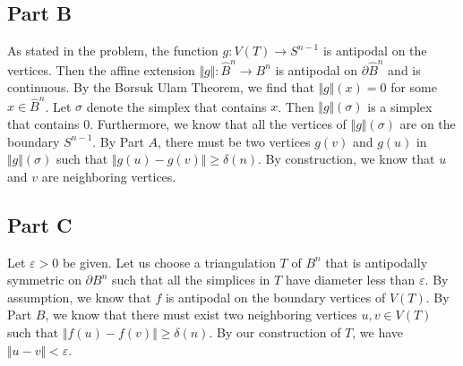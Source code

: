 \documentclass[12pt]{article}
\begin{document}
\subsection*{Part B}
As stated in the problem, the function $g: V(T) \rightarrow S^{n-1}$ is antipodal on the vertices. Then the affine extension $\Vert g \Vert: \hat{B}^n \rightarrow B^n$ is antipodal on $\partial{\hat{B}^n}$ and is continuous. By the Borsuk Ulam Theorem, we find that $\Vert g\Vert(x) = 0$ for some $x \in \hat{B}^n$. Let $\sigma$ denote the simplex that contains $x$. Then $\Vert g \Vert(\sigma)$ is a simplex that contains $0$. Furthermore, we know that all the vertices of $\Vert g \Vert(\sigma)$ are on the boundary $S^{n-1}$. By Part $A$, there must be two vertices $g(v)$ and $g(u)$ in $\Vert g \Vert(\sigma)$ such that $\Vert g(u) - g(v) \Vert \geq \delta(n)$.  By construction, we know that $u$ and $v$ are neighboring vertices.
\newpage
\subsection*{Part C}
Let $\varepsilon > 0$ be given. Let us choose a triangulation $T$ of $B^n$ that is antipodally symmetric on $\partial{B}^n$ such that all the simplices in $T$ have diameter less than $\varepsilon$. By assumption, we know that $f$ is antipodal on the boundary vertices of $V(T)$. By Part $B$, we know that there must exist two neighboring vertices $u,v \in V(T)$ such that $\Vert f(u) - f(v) \Vert \geq \delta(n)$. By our construction of $T$, we have $\Vert u - v \Vert < \varepsilon$.
\end{document}

